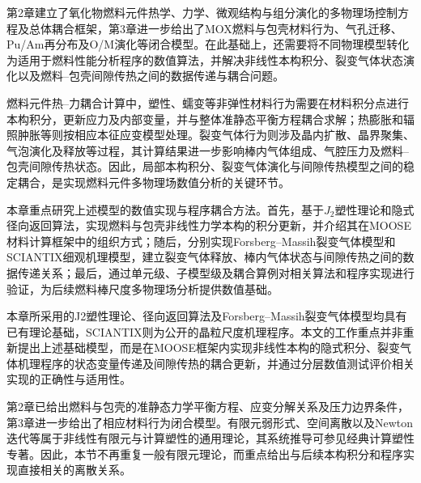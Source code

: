 

第2章建立了氧化物燃料元件热学、力学、微观结构与组分演化的多物理场控制方程及总体耦合框架，第3章进一步给出了MOX燃料与包壳材料行为、气孔迁移、Pu/Am再分布及O/M演化等闭合模型。在此基础上，还需要将不同物理模型转化为适用于燃料性能分析程序的数值算法，并解决非线性本构积分、裂变气体状态演化以及燃料--包壳间隙传热之间的数据传递与耦合问题。

燃料元件热--力耦合计算中，塑性、蠕变等非弹性材料行为需要在材料积分点进行本构积分，更新应力及内部变量，并与整体准静态平衡方程耦合求解；热膨胀和辐照肿胀等则按相应本征应变模型处理。裂变气体行为则涉及晶内扩散、晶界聚集、气泡演化及释放等过程，其计算结果进一步影响棒内气体组成、气腔压力及燃料--包壳间隙传热状态。因此，局部本构积分、裂变气体演化与间隙传热模型之间的稳定耦合，是实现燃料元件多物理场数值分析的关键环节。

本章重点研究上述模型的数值实现与程序耦合方法。首先，基于$J_2$塑性理论和隐式径向返回算法，实现燃料与包壳非线性力学本构的积分更新，并介绍其在MOOSE材料计算框架中的组织方式；随后，分别实现Forsberg--Massih裂变气体模型和SCIANTIX细观机理模型，建立裂变气体释放、棒内气体状态与间隙传热之间的数据传递关系；最后，通过单元级、子模型级及耦合算例对相关算法和程序实现进行验证，为后续燃料棒尺度多物理场分析提供数值基础。

本章所采用的J2塑性理论、径向返回算法及Forsberg–Massih裂变气体模型均具有已有理论基础，SCIANTIX则为公开的晶粒尺度机理程序。本文的工作重点并非重新提出上述基础模型，而是在MOOSE框架内实现非线性本构的隐式积分、裂变气体机理程序的状态变量传递及间隙传热的耦合更新，并通过分层数值测试评价相关实现的正确性与适用性。

第2章已给出燃料与包壳的准静态力学平衡方程、应变分解关系及压力边界条件，第3章进一步给出了相应材料行为闭合模型。有限元弱形式、空间离散以及Newton迭代等属于非线性有限元与计算塑性的通用理论，其系统推导可参见经典计算塑性专著\cite{dunneIntroductionComputationalPlasticity2005}。因此，本节不再重复一般有限元理论，而重点给出与后续本构积分和程序实现直接相关的离散关系。

